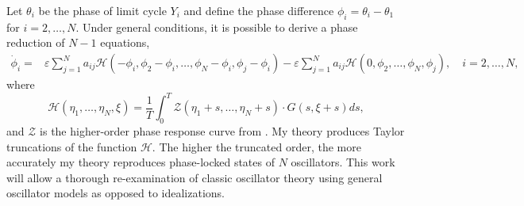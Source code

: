 \documentclass[a4paper,11pt]{article}
\newcommand{\ve}{\varepsilon}
\newcommand{\h}{\mathcal{H}}
\begin{document}
Let $\theta_i$ be the phase of limit cycle $Y_i$ and define the phase difference $\phi_i=\theta_i-\theta_1$ for $i=2,\ldots,N$. Under general conditions, it is possible to derive a phase reduction of $N-1$ equations,
\begin{align*}
\dot \phi_i =& \ve\sum_{j=1}^N a_{ij} \h(-\phi_i,\phi_2-\phi_i,\ldots,\phi_N-\phi_i,\phi_j-\phi_i)- \ve\sum_{j=1}^N a_{ij} \h(0,\phi_2,\ldots,\phi_N,\phi_j), \quad i=2,\ldots,N,
\end{align*}
where
\begin{equation*}
\h(\eta_1,\ldots,\eta_N,\xi) = \frac{1}{T} \int_0^T \mathcal{Z}(\eta_1+s,\ldots,\eta_N+s) \cdot G(s,\xi+s)ds,
\end{equation*}
and $\mathcal{Z}$ is the higher-order phase response curve from \cite{wilson2020phase}. My theory produces Taylor truncations of the function $\h$. The higher the truncated order, the more accurately my theory reproduces phase-locked states of $N$ oscillators. This work will allow a thorough re-examination of classic oscillator theory using general oscillator models as opposed to idealizations.



\end{document}
